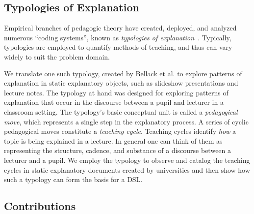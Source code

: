 \documentclass[conference]{IEEEtran}
\begin{document}
\subsection{Typologies of Explanation}

Empirical branches of pedagogic theory have created, deployed, and analyzed
numerous ``coding systems'', known as \emph{typologies of
  explanation}~\cite{westbury1971research, nla.cat-vn407830,
  rosenshine1968objectively, hyman1968teaching, Ennis1969-ENNLIT,
  smith1967language, bellack1966language}. Typically, typologies are employed to
quantify methods of teaching, and thus can vary widely to suit the problem 
domain.

We translate one such typology, created by Bellack et
al.\cite{bellack1966language} to explore patterns of explanation in static
explanatory objects, such as slideshow presentations and lecture notes. The
typology at hand was designed for exploring patterns of explanation that occur
in the discourse between a pupil and lecturer in a classroom setting. The
typology's basic conceptual unit is called a \emph{pedagogical move}, which
represents a single step in the explanatory process. A series of cyclic
pedagogical moves constitute a \emph{teaching cycle}. Teaching cycles identify
\emph{how} a topic is being explained in a lecture. In general one can think of
them as representing the structure, cadence, and substance of a discourse
between a lecturer and a pupil. We employ the typology to observe and catalog
the teaching cycles in static explanatory documents created by universities and
then show how such a typology can form the basis for a DSL.

\subsection{Contributions}
\end{document}
